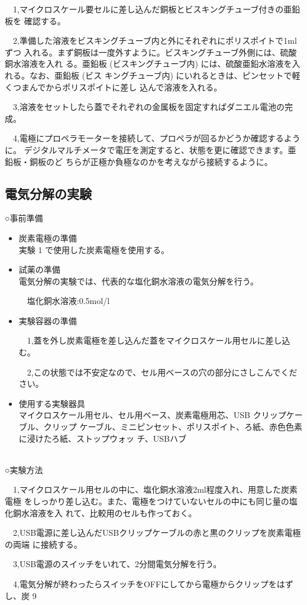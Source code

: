 \documentclass[11pt,a4j]{jarticle}
\begin{document}
\ \ 1,マイクロスケール要セルに差し込んだ銅板とビスキングチューブ付きの亜鉛板を 確認する。\par
\ \ 2,準備した溶液をビスキングチューブ内と外にそれぞれにポリスポイトで1mlずつ 入れる。まず銅板は一度外すように。ビスキングチューブ外側には、硫酸銅水溶液を入れ る。亜鉛板 (ビスキングチューブ内) には、硫酸亜鉛水溶液を入れる。なお、亜鉛板 (ビス キングチューブ内) にいれるときは、ピンセットで軽くつまんでからポリスポイトに差し 込んで溶液を入れる。\par
\ \ 3,溶液をセットしたら蓋でそれぞれの金属板を固定すればダニエル電池の完成。\par
\ \ 4,電極にプロペラモーターを接続して、プロペラが回るかどうか確認するように。 デジタルマルチメータで電圧を測定すると、状態を更に確認できます。亜鉛板・銅板のど ちらが正極か負極なのかを考えながら接続するように。
\newpage \subsection{電気分解の実験} ○事前準備
\begin{itemize}
\item 炭素電極の準備 \\
実験 1 で使用した炭素電極を使用する。
\item 試薬の準備 \\ 電気分解の実験では、代表的な塩化銅水溶液の電気分解を行う。\par \ \ 塩化銅水溶液:0.5mol/l
\item 実験容器の準備 \par
\ \ 1,蓋を外し炭素電極を差し込んだ蓋をマイクロスケール用セルに差し込む。\par \ \ 2,この状態では不安定なので、セル用ベースの穴の部分にさしこんでください。
\item 使用する実験器具 \\ マイクロスケール用セル、セル用ベース、炭素電極用芯、USB クリップケーブル、クリップ ケーブル、ミニピンセット、ポリスポイト、ろ紙、赤色色素に浸けたろ紙、ストップウォッ チ、USBハブ \\ \\
\end{itemize}
○実験方法 \par
\ \ 1,マイクロスケール用セルの中に、塩化銅水溶液2ml程度入れ、用意した炭素電極 をしっかり差し込む。また、電極をつけていないセルの中にも同じ量の塩化銅水溶液を入 れて、比較用のセルも作っておく。\par
\ \ 2,USB電源に差し込んだUSBクリップケーブルの赤と黒のクリップを炭素電極の両端 に接続する。\par
\ \ 3,USB電源のスイッチをいれて、2分間電気分解を行う。\par
\ \ 4,電気分解が終わったらスイッチをOFFにしてから電極からクリップをはずし、炭
9
\end{document}
